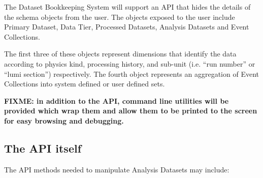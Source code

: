 \documentclass[pdftex]{cmspaper}
\begin{document}
  The Dataset Bookkeeping System will support an API that hides the details of 
the schema objects from the user. The objects exposed to the user include 
Primary Dataset, Data Tier, Processed Datasets, Analysis Datasets and Event 
Collections.  

The first three of these objects represent dimensions that identify the data 
according to physics kind, processing history, and sub-unit (i.e. ``run 
number'' or ``lumi section'') respectively.  The fourth object represents an 
aggregation of Event Collections into system defined or user defined sets.  

  {\bf FIXME: in addition to the API, command line utilities will be provided
which wrap them and allow them to be printed to the screen for easy browsing
and debugging.}

\subsection{The API itself}
  The API methods needed to manipulate Analysis Datasets may include: 
\end{document}
